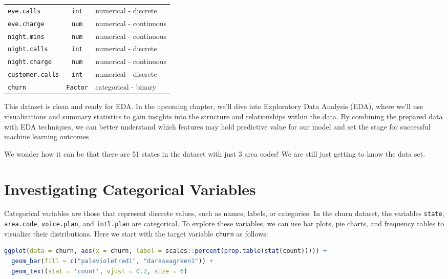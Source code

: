 \documentclass[
]{book}
\newcommand{\passthrough}[1]{#1}
\theoremstyle{definition}
\theoremstyle{definition}
\theoremstyle{definition}
\theoremstyle{definition}
\theoremstyle{remark}
\begin{document}
\begin{longtable}[]{@{}lcl@{}}
\passthrough{\lstinline!eve.calls!} & \passthrough{\lstinline!int!} & numerical - discrete \\
\passthrough{\lstinline!eve.charge!} & \passthrough{\lstinline!num!} & numerical - continuous \\
\passthrough{\lstinline!night.mins!} & \passthrough{\lstinline!num!} & numerical - continuous \\
\passthrough{\lstinline!night.calls!} & \passthrough{\lstinline!int!} & numerical - discrete \\
\passthrough{\lstinline!night.charge!} & \passthrough{\lstinline!num!} & numerical - continuous \\
\passthrough{\lstinline!customer.calls!} & \passthrough{\lstinline!int!} & numerical - discrete \\
\passthrough{\lstinline!churn!} & \passthrough{\lstinline!Factor!} & categorical - binary \\
\end{longtable}

This dataset is clean and ready for EDA. In the upcoming chapter, we'll dive into Exploratory Data Analysis (EDA), where we'll use visualizations and summary statistics to gain insights into the structure and relationships within the data. By combining the prepared data with EDA techniques, we can better understand which features may hold predictive value for our model and set the stage for successful machine learning outcomes.

We wonder how it can be that there are 51 states in the dataset with just 3 area codes! We are still just getting to know the data set.

\section{Investigating Categorical Variables}\label{chapter-EDA-categorical}

Categorical variables are those that represent discrete values, such as names, labels, or categories. In the churn dataset, the variables \passthrough{\lstinline!state!}, \passthrough{\lstinline!area.code!}, \passthrough{\lstinline!voice.plan!}, and \passthrough{\lstinline!intl.plan!} are categorical. To explore these variables, we can use bar plots, pie charts, and frequency tables to visualize their distributions. Here we start with the target variable \passthrough{\lstinline!churn!} as follows:

\begin{lstlisting}[language=R]
ggplot(data = churn, aes(x = churn, label = scales::percent(prop.table(stat(count))))) +
  geom_bar(fill = c("palevioletred1", "darkseagreen1")) + 
  geom_text(stat = 'count', vjust = 0.2, size = 6)
\end{lstlisting}
\end{document}
